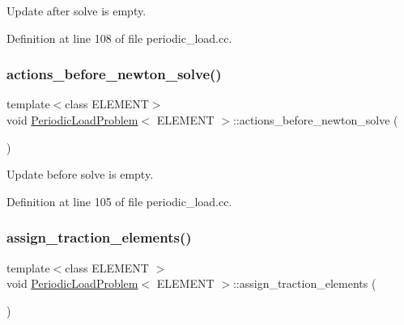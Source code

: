Update after solve is empty. 



Definition at line 108 of file periodic\+\_\+load.\+cc.

\mbox{\label{classPeriodicLoadProblem_aad83601d810e4cc135f83c1308a0449b}} 
\subsubsection{\texorpdfstring{actions\+\_\+before\+\_\+newton\+\_\+solve()}{actions\_before\_newton\_solve()}}
{\footnotesize\ttfamily template$<$class E\+L\+E\+M\+E\+NT$>$ \\
void \hyperlink{classPeriodicLoadProblem}{Periodic\+Load\+Problem}$<$ E\+L\+E\+M\+E\+NT $>$\+::actions\+\_\+before\+\_\+newton\+\_\+solve (\begin{DoxyParamCaption}{ }\end{DoxyParamCaption})\hspace{0.3cm}{\ttfamily [inline]}}



Update before solve is empty. 



Definition at line 105 of file periodic\+\_\+load.\+cc.

\mbox{\label{classPeriodicLoadProblem_ad850863c61c0055e230e6319d67905e2}} 
\subsubsection{\texorpdfstring{assign\+\_\+traction\+\_\+elements()}{assign\_traction\_elements()}}
{\footnotesize\ttfamily template$<$class E\+L\+E\+M\+E\+NT $>$ \\
void \hyperlink{classPeriodicLoadProblem}{Periodic\+Load\+Problem}$<$ E\+L\+E\+M\+E\+NT $>$\+::assign\+\_\+traction\+\_\+elements (\begin{DoxyParamCaption}{ }\end{DoxyParamCaption})\hspace{0.3cm}{\ttfamily [private]}}



